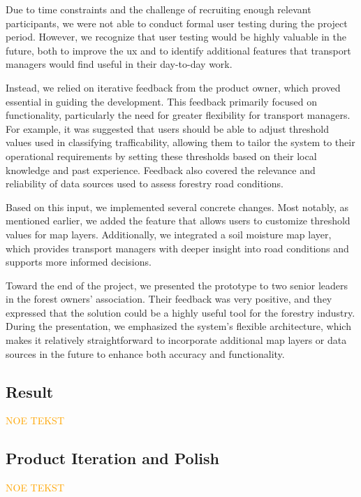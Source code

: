Due to time constraints and the challenge of recruiting enough relevant participants, we were not able to conduct formal user testing during the project period. However, we recognize that user testing would be highly valuable in the future, both to improve the \acrfull{ux} and to identify additional features that transport managers would find useful in their day-to-day work.

Instead, we relied on iterative feedback from the product owner, which proved essential in guiding the development. This feedback primarily focused on functionality, particularly the need for greater flexibility for transport managers. For example, it was suggested that users should be able to adjust threshold values used in classifying trafficability, allowing them to tailor the system to their operational requirements by setting these thresholds based on their local knowledge and past experience. Feedback also covered the relevance and reliability of data sources used to assess forestry road conditions.

Based on this input, we implemented several concrete changes. Most notably, as mentioned earlier, we added the feature that allows users to customize threshold values for map layers. Additionally, we integrated a soil moisture map layer, which provides transport managers with deeper insight into road conditions and supports more informed decisions.

Toward the end of the project, we presented the prototype to two senior leaders in the forest owners’ association. Their feedback was very positive, and they expressed that the solution could be a highly useful tool for the forestry industry. During the presentation, we emphasized the system’s flexible architecture, which makes it relatively straightforward to incorporate additional map layers or data sources in the future to enhance both accuracy and functionality.

\subsection{Result}

\textcolor{orange}{NOE TEKST}

\subsection{Product Iteration and Polish}

\textcolor{orange}{NOE TEKST}
